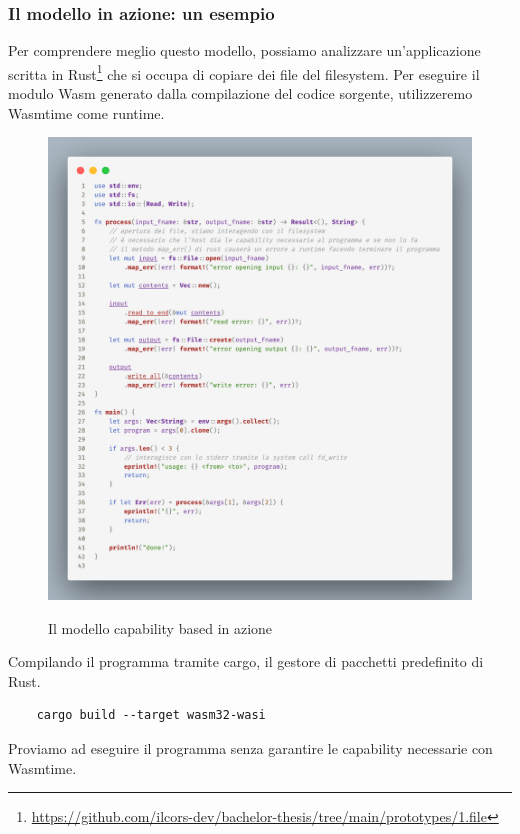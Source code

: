 \subsubsection{Il modello in azione: un esempio}
Per comprendere meglio questo modello, possiamo analizzare un'applicazione scritta in
Rust\footnote{\url{https://github.com/ilcors-dev/bachelor-thesis/tree/main/prototypes/1.file}} che si occupa di copiare
dei file del filesystem. Per eseguire il modulo Wasm generato dalla compilazione del codice sorgente, utilizzeremo
Wasmtime come runtime.
\begin{figure}[H]
    \centering
    \captionsetup{justification=centering}
    \includegraphics[width=15cm]{./chapters/2.wasi-in-depth/images/5.wasi_capability_example.png}
    \label{wasi_capabilities_example}
    \caption{Il modello capability based in azione}
\end{figure}
Compilando il programma tramite cargo, il gestore di pacchetti predefinito di Rust.
\begin{lstlisting}
    cargo build --target wasm32-wasi
\end{lstlisting}

Proviamo ad eseguire il programma senza garantire le capability necessarie con Wasmtime.

